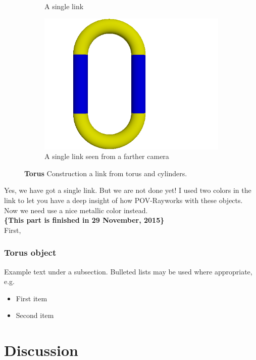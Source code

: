 \documentclass[fleqn,10pt]{wlscirep}
\newcommand*{\PV}{POV-Ray}
\begin{document}
\begin{figure}
\begin{subfigure}{0.31\textwidth}
\caption{A single link} \label{fig:FIG10b}
\end{subfigure}
\hspace*{\fill} %
\begin{subfigure}{0.31\textwidth}
\includegraphics[width=\linewidth]{FIG10c}
\caption{A single link seen from a farther camera} \label{fig:FIG10c}
\end{subfigure}
\caption{\textbf{Torus} Construction a link from torus and cylinders.} \label{}
\end{figure}
Yes, we have got a single link. But we are not done yet! I used two colors in the link to let you have a deep insight of how \PV works with these objects. Now we need use a nice metallic color instead. \\
\textbf{\{This part is finished in  29 November, 2015\}}\\
First,


\subsubsection*{Torus object}


Example text under a subsection. Bulleted lists may be used where appropriate, e.g.

\begin{itemize}
\item First item
\item Second item
\end{itemize}

\section*{Discussion}
\end{document}
